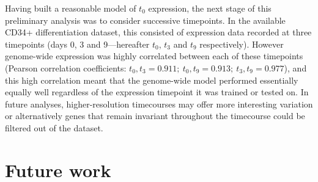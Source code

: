 \documentclass[a4paper]{report}
\begin{document}

Having built a reasonable model of $t_0$ expression, the next stage of
this preliminary analysis was to consider successive timepoints. In the
available CD34+ differentiation dataset, this consisted of expression
data recorded at three
timepoints (days 0, 3 and 9---hereafter $t_0$, $t_3$ and $t_9$
respectively). However genome-wide expression
was highly correlated between each of these timepoints (Pearson correlation coefficients: $t_0, t_3 = 0.911; ~t_0,t_9 =
0.913; ~t_3,t_9 = 0.977$), and this high correlation meant that the
genome-wide model performed essentially equally well regardless of the
expression timepoint it was trained or tested on. In future analyses, higher-resolution timecourses may offer
more interesting variation or alternatively genes that remain invariant
throughout the timecourse could be filtered out of the dataset. 

\chapter*{Future work}

\end{document}
